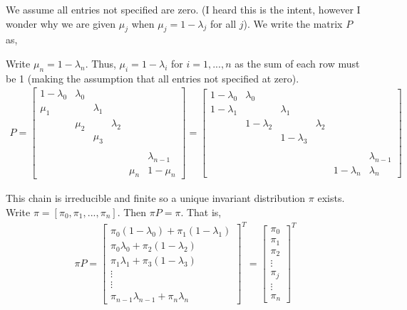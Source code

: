 \documentclass[10pt]{article}
\begin{document}
\begin{solution}[Solution]
We assume all entries not specified are zero. (I heard this is the intent, however I wonder why we are given \( \mu_j\) when \( \mu_j=1-\lambda_j \) for all \( j \)). We write the matrix \( P \) as,

Write \( \mu_n=1-\lambda_n  \). Thus, \( \mu_i=1-\lambda_i \) for \( i=1, ..., n \) as the sum of each row must be 1 (making the assumption that all entries not specified at zero). 
    {\tiny
    \begin{align*}
    P = \left[\begin{array}{rrrrrr}
        1-\lambda_0 & \lambda_0 & & &\\
        \mu_1 & & \lambda_1 & & \\
        & \mu_2 & & \lambda_2 & \\
        & & \mu_3 \\\\
        & & & & & \lambda_{n-1} \\
        & & & & \mu_n & 1-\mu_n
    \end{array}\right]
      = \left[\begin{array}{rrrrrr}
        1-\lambda_0 & \lambda_0 & & &\\
        1-\lambda_1 & & \lambda_1 & & \\
        & 1-\lambda_2 & & \lambda_2 & \\
        && 1-\lambda_3\\\\
        & & & & & \lambda_{n-1} \\
        & & & & 1-\lambda_n & \lambda_n
    \end{array}\right]
\end{align*}
    }

This chain is irreducible and finite so a unique invariant distribution \( \pi \) exists. Write \( \pi=[\pi_0,\pi_1, ..., \pi_n] \). Then \( \pi P = \pi \). That is,
\begin{align*}
    \pi P = \left[\begin{array}{r}
        \pi_0(1-\lambda_0)+\pi_1(1-\lambda_1) \\
        \pi_0 \lambda_0 + \pi_2(1-\lambda_2) \\ 
        \pi_1\lambda_1+\pi_3(1-\lambda_3) \\
        \vdots \\ 
        \vdots \\
        \pi_{n-1}\lambda_{n-1}+\pi_n\lambda_n
    \end{array}\right]^T
= \left[\begin{array}{r}
    \pi_0 \\ 
    \pi_1 \\
    \pi_2 \\
    \vdots \\
    \pi_j \\
    \vdots \\
    \pi_n
\end{array}\right]^T
\end{align*}


\end{solution}
\end{document}
